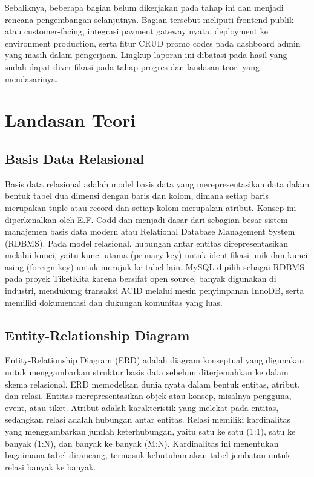 \documentclass[12pt,a4paper]{report}
\begin{document}
Sebaliknya, beberapa bagian belum dikerjakan pada tahap ini dan menjadi rencana pengembangan selanjutnya. Bagian tersebut meliputi frontend publik atau customer-facing, integrasi payment gateway nyata, deployment ke environment production, serta fitur CRUD promo codes pada dashboard admin yang masih dalam pengerjaan. Lingkup laporan ini dibatasi pada hasil yang sudah dapat diverifikasi pada tahap progres dan landasan teori yang mendasarinya.

\chapter{Landasan Teori}

\section{Basis Data Relasional}
Basis data relasional adalah model basis data yang merepresentasikan data dalam bentuk tabel dua dimensi dengan baris dan kolom, dimana setiap baris merupakan tuple atau record dan setiap kolom merupakan atribut. Konsep ini diperkenalkan oleh E.F. Codd dan menjadi dasar dari sebagian besar sistem manajemen basis data modern atau Relational Database Management System (RDBMS). Pada model relasional, hubungan antar entitas direpresentasikan melalui kunci, yaitu kunci utama (primary key) untuk identifikasi unik dan kunci asing (foreign key) untuk merujuk ke tabel lain. MySQL dipilih sebagai RDBMS pada proyek TiketKita karena bersifat open source, banyak digunakan di industri, mendukung transaksi ACID melalui mesin penyimpanan InnoDB, serta memiliki dokumentasi dan dukungan komunitas yang luas.

\section{Entity-Relationship Diagram}
Entity-Relationship Diagram (ERD) adalah diagram konseptual yang digunakan untuk menggambarkan struktur basis data sebelum diterjemahkan ke dalam skema relasional. ERD memodelkan dunia nyata dalam bentuk entitas, atribut, dan relasi. Entitas merepresentasikan objek atau konsep, misalnya pengguna, event, atau tiket. Atribut adalah karakteristik yang melekat pada entitas, sedangkan relasi adalah hubungan antar entitas. Relasi memiliki kardinalitas yang menggambarkan jumlah keterhubungan, yaitu satu ke satu (1:1), satu ke banyak (1:N), dan banyak ke banyak (M:N). Kardinalitas ini menentukan bagaimana tabel dirancang, termasuk kebutuhan akan tabel jembatan untuk relasi banyak ke banyak.
\end{document}
